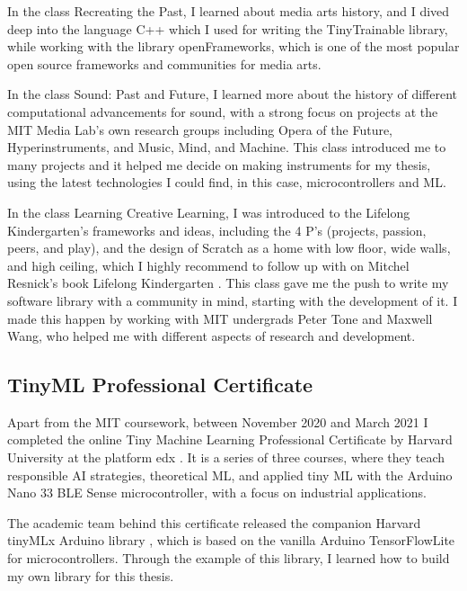 In the class Recreating the Past, I learned about media arts history, and I dived deep into the language C++ which I used for writing the TinyTrainable library, while working with the library openFrameworks, which is one of the most popular open source frameworks and communities for media arts.

In the class Sound: Past and Future, I learned more about the history of different computational advancements for sound, with a strong focus on projects at the MIT Media Lab's own research groups including Opera of the Future, Hyperinstruments, and Music, Mind, and Machine. This class introduced me to many projects and it helped me decide on making instruments for my thesis, using the latest technologies I could find, in this case, microcontrollers and \acrshort{ML}.

In the class Learning Creative Learning, I was introduced to the Lifelong Kindergarten's frameworks and ideas, including the 4 P's (projects, passion, peers, and play), and the design of Scratch as a home with low floor, wide walls, and high ceiling, which I highly recommend to follow up with  on Mitchel Resnick's book Lifelong Kindergarten \cite{lifelong-kindergarten}. This class gave me the push to write my software library with a community in mind, starting with the development of it. I made this happen by working with MIT undergrads Peter Tone and Maxwell Wang, who helped me with different aspects of research and development.

\subsection{TinyML Professional Certificate}

Apart from the MIT coursework, between November 2020 and March 2021 I completed the online Tiny Machine Learning Professional Certificate by Harvard University at the platform edx \cite{website-edx-harvardx-tinymlx-professional-certificate}. It is a series of three courses, where they teach responsible \acrshort{AI} strategies, theoretical \acrshort{ML}, and applied tiny \acrshort{ML} with the Arduino Nano 33 BLE Sense microcontroller, with a focus on industrial applications.

The academic team behind this certificate released the companion Harvard tinyMLx Arduino library \cite{repository-tinymlx-arduino-library}, which is based on the vanilla Arduino TensorFlowLite for microcontrollers. Through the example of this library, I learned how to build my own library for this thesis.


